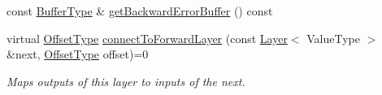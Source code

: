 \begin{DoxyCompactItemize}
\item 
const \hyperlink{classffnn_1_1layer_1_1_layer_a3f2e9c375d9bcf80e6000e9e53ba212d}{Buffer\-Type} \& \hyperlink{classffnn_1_1layer_1_1_layer_a0caad62750e9610e607fb18d87df63b8}{get\-Backward\-Error\-Buffer} () const 
\item 
virtual \hyperlink{classffnn_1_1layer_1_1internal_1_1_interface_adc5bb454329ebd51ac26579a43c006fd}{Offset\-Type} \hyperlink{classffnn_1_1layer_1_1_layer_a430276d228f0bf349f0b03b2bdaecba8}{connect\-To\-Forward\-Layer} (const \hyperlink{classffnn_1_1layer_1_1_layer}{Layer}$<$ Value\-Type $>$ \&next, \hyperlink{classffnn_1_1layer_1_1internal_1_1_interface_adc5bb454329ebd51ac26579a43c006fd}{Offset\-Type} offset)=0
\begin{DoxyCompactList}\small\item\em Maps outputs of this layer to inputs of the next. \end{DoxyCompactList}\end{DoxyCompactItemize}
